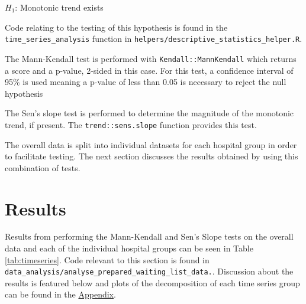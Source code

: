 \documentclass[
  12pt,
]{article}
\begin{document}
\(H_1\): Monotonic trend exists

Code relating to the testing of this hypothesis is found in the \texttt{time\_series\_analysis} function in \texttt{helpers/descriptive\_statistics\_helper.R}.

The Mann-Kendall test is performed with \texttt{Kendall::MannKendall} which returns a score and a p-value, 2-sided in this case. For this test, a confidence interval of 95\% is used meaning a p-value of less than 0.05 is necessary to reject the null hypothesis

The Sen's slope test is performed to determine the magnitude of the monotonic trend, if present. The \texttt{trend::sens.slope} function provides this test.

The overall data is split into individual datasets for each hospital group in order to facilitate testing. The next section discusses the results obtained by using this combination of tests.

\newpage

\hypertarget{results}{%
\section{Results}\label{results}}

Results from performing the Mann-Kendall and Sen's Slope tests on the overall data and each of the individual hospital groups can be seen in Table \ref{tab:timeseries}. Code relevant to this section is found in \texttt{data\_analysis/analyse\_prepared\_waiting\_list\_data.}. Discussion about the results is featured below and plots of the decomposition of each time series group can be found in the \hyperref[sec:appendix]{Appendix}.
\end{document}
